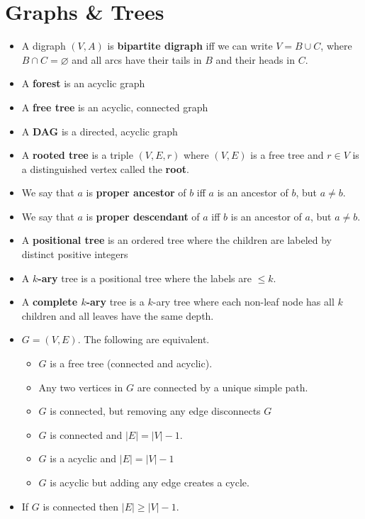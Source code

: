 \documentclass[12pt]{scrartcl}
\let\emptyset\varnothing{}
\begin{document}
\section{Graphs \& Trees}
\begin{itemize}
    \item A digraph $(V, A)$ is \textbf{bipartite digraph} iff we can write $V = B \cup C$, where $B \cap C = \emptyset$ and all arcs have their tails in $B$ and their heads in $C$.
    \item A \textbf{forest} is an acyclic graph
    \item A \textbf{free tree} is an acyclic, connected graph
    \item A \textbf{DAG} is a directed, acyclic graph
    \item A \textbf{rooted tree} is a triple $(V, E, r)$ where $(V, E)$ is a free tree and $r \in V$ is a distinguished vertex called the \textbf{root}.
    \item We say that $a$ is \textbf{proper ancestor} of $b$ iff $a$ is an ancestor of $b$, but $a \neq b$.
    \item We say that $a$ is \textbf{proper descendant} of $a$ iff $b$ is an ancestor of $a$, but $a \neq b$.
    \item A \textbf{positional tree} is an ordered tree where the children are labeled by distinct positive integers
    \item A \textbf{$k$-ary} tree is a positional tree where the labels are $\leq k$.
    \item A \textbf{complete $k$-ary} tree is a $k$-ary tree where each non-leaf node has all $k$ children and all leaves have the same depth.
    \item $G = (V, E)$. The following are equivalent.
        \begin{itemize}
            \item $G$ is a free tree (connected and acyclic).
            \item Any two vertices in $G$ are connected by a unique simple path.
            \item $G$ is connected, but removing any edge disconnects $G$
            \item $G$ is connected and $|E| = |V| - 1$.
            \item $G$ is a acyclic and $|E| = |V| - 1$
            \item $G$ is acyclic but adding any edge creates a cycle.
        \end{itemize}

    \item If $G$ is connected then $|E| \geq |V| - 1$.
\end{itemize}
\end{document}
